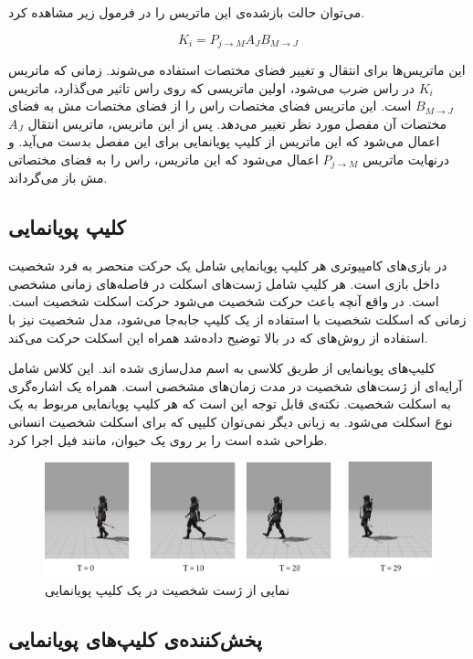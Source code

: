 می‌توان حالت باز‌شده‌ی این ماتریس را در فرمول زیر مشاهده کرد.


\[ K_i =  P_{j \rightarrow M} A_J B_{M \rightarrow J} \]

این ماتریس‌ها برای انتقال و تغییر فضای مختصات استفاده می‌شوند.
زمانی که ماتریس \(K_i\)
در راس ضرب می‌شود، اولین ماتریسی که روی راس تاثیر می‌گذارد، ماتریس 
\(B_{M \rightarrow J}\)
است. این ماتریس فضای مختصات راس را از فضای مختصات مش به فضای مختصات آن مفصل مورد نظر تغییر می‌دهد.
پس از این ماتریس، ماتریس انتقال 
\(A_J\) 
اعمال می‌شود که این ماتریس از کلیپ پویانمایی برای این مفصل بدست می‌آید.
و درنهایت ماتریس 
\(P_{j \rightarrow M}\)
اعمال می‌شود که این ماتریس، راس را به فضای مختصاتی مش باز می‌گرداند.



\subsection{کلیپ پویانمایی}
در بازی‌های کامپیوتری هر کلیپ پویانمایی شامل یک حرکت منحصر به فرد شخصیت داخل بازی است.
هر کلیپ‌ شامل ژست‌های اسکلت در فاصله‌های زمانی مشخصی است. در واقع آنچه باعث حرکت شخصیت می‌شود حرکت اسکلت شخصیت است.
زمانی که اسکلت شخصیت با استفاده از یک کلیپ جابه‌جا می‌شود، مدل شخصیت نیز با استفاده از روش‌های 
که در بالا توضیح داده‌شد همراه این اسکلت حرکت می‌کند.

کلیپ‌های پویانمایی از طریق کلاسی به اسم
مدل‌سازی شده اند. 
این کلاس شامل آرایه‌ای از ژست‌های شخصیت در مدت زمان‌های مشخصی است. همراه یک اشاره‌گری به اسکلت شخصیت.
نکته‌ی قابل توجه این است که هر کلیپ پویانمایی مربوط به یک نوع اسکلت می‌شود. به زبانی دیگر نمی‌توان کلیپی که برای اسکلت
شخصیت انسانی طراحی شده است را بر روی یک حیوان، مانند فیل اجرا کرد.

\begin{figure}[ht]
	\centerline{\includegraphics[width=\textwidth,height=\textheight,keepaspectratio]{Figures/Ch5/AnimationClip.png}}

	\caption{نمایی از ژست شخصیت در یک کلیپ پویانمایی}
	\label{fig:AnimationClip}
\end{figure}


\subsection{پخش‌کننده‌ی کلیپ‌های پویانمایی}

